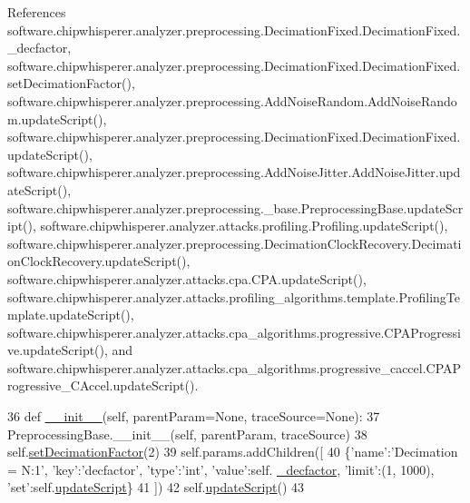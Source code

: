 References software.\+chipwhisperer.\+analyzer.\+preprocessing.\+Decimation\+Fixed.\+Decimation\+Fixed.\+\_\+decfactor, software.\+chipwhisperer.\+analyzer.\+preprocessing.\+Decimation\+Fixed.\+Decimation\+Fixed.\+set\+Decimation\+Factor(), software.\+chipwhisperer.\+analyzer.\+preprocessing.\+Add\+Noise\+Random.\+Add\+Noise\+Random.\+update\+Script(), software.\+chipwhisperer.\+analyzer.\+preprocessing.\+Decimation\+Fixed.\+Decimation\+Fixed.\+update\+Script(), software.\+chipwhisperer.\+analyzer.\+preprocessing.\+Add\+Noise\+Jitter.\+Add\+Noise\+Jitter.\+update\+Script(), software.\+chipwhisperer.\+analyzer.\+preprocessing.\+\_\+base.\+Preprocessing\+Base.\+update\+Script(), software.\+chipwhisperer.\+analyzer.\+attacks.\+profiling.\+Profiling.\+update\+Script(), software.\+chipwhisperer.\+analyzer.\+preprocessing.\+Decimation\+Clock\+Recovery.\+Decimation\+Clock\+Recovery.\+update\+Script(), software.\+chipwhisperer.\+analyzer.\+attacks.\+cpa.\+C\+P\+A.\+update\+Script(), software.\+chipwhisperer.\+analyzer.\+attacks.\+profiling\+\_\+algorithms.\+template.\+Profiling\+Template.\+update\+Script(), software.\+chipwhisperer.\+analyzer.\+attacks.\+cpa\+\_\+algorithms.\+progressive.\+C\+P\+A\+Progressive.\+update\+Script(), and software.\+chipwhisperer.\+analyzer.\+attacks.\+cpa\+\_\+algorithms.\+progressive\+\_\+caccel.\+C\+P\+A\+Progressive\+\_\+\+C\+Accel.\+update\+Script().


\begin{DoxyCode}
36     \textcolor{keyword}{def }\hyperlink{classsoftware_1_1chipwhisperer_1_1analyzer_1_1preprocessing_1_1DecimationFixed_1_1DecimationFixed_a303b274795aa35631678204300d3456f}{\_\_init\_\_}(self, parentParam=None, traceSource=None):
37         PreprocessingBase.\_\_init\_\_(self, parentParam, traceSource)
38         self.\hyperlink{classsoftware_1_1chipwhisperer_1_1analyzer_1_1preprocessing_1_1DecimationFixed_1_1DecimationFixed_a5dab6641c9fcab300990e2b7aee0a5bc}{setDecimationFactor}(2)
39         self.params.addChildren([
40             \{\textcolor{stringliteral}{'name'}:\textcolor{stringliteral}{'Decimation = N:1'}, \textcolor{stringliteral}{'key'}:\textcolor{stringliteral}{'decfactor'}, \textcolor{stringliteral}{'type'}:\textcolor{stringliteral}{'int'}, \textcolor{stringliteral}{'value'}:self.
      \hyperlink{classsoftware_1_1chipwhisperer_1_1analyzer_1_1preprocessing_1_1DecimationFixed_1_1DecimationFixed_acb216f8a8b59a521741dc39527e0e597}{\_decfactor}, \textcolor{stringliteral}{'limit'}:(1, 1000), \textcolor{stringliteral}{'set'}:self.\hyperlink{classsoftware_1_1chipwhisperer_1_1analyzer_1_1preprocessing_1_1DecimationFixed_1_1DecimationFixed_ad424ada12360da0d5bd081ba0817235f}{updateScript}\}
41         ])
42         self.\hyperlink{classsoftware_1_1chipwhisperer_1_1analyzer_1_1preprocessing_1_1DecimationFixed_1_1DecimationFixed_ad424ada12360da0d5bd081ba0817235f}{updateScript}()
43 
\end{DoxyCode}


